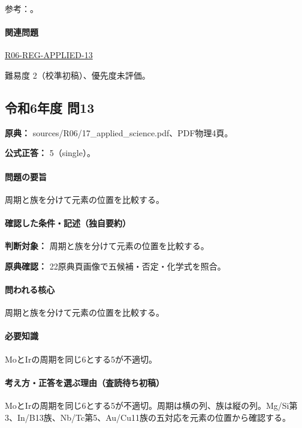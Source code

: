 \par 参考：\cite{atomic_nist2019}。

\paragraph{関連問題} \hyperref[q:r06-reg-applied-13]{R06-REG-APPLIED-13}

\par 難易度 2（校準初稿）、優先度未評価。

\subsection{令和6年度 問13}
\label{q:r06-reg-applied-13}

\noindent\textbf{原典：} sources/R06/17\_applied\_science.pdf、PDF物理4頁。

\textbf{公式正答：} 5（single）。

\paragraph{問題の要旨} 周期と族を分けて元素の位置を比較する。

\paragraph{確認した条件・記述（独自要約）}\mbox{}\par

\noindent\textbf{判断対象：} 周期と族を分けて元素の位置を比較する。\par

\noindent\textbf{原典確認：} 22原典頁画像で五候補・否定・化学式を照合。\par

\paragraph{問われる核心} 周期と族を分けて元素の位置を比較する。

\paragraph{必要知識} MoとIrの周期を同じ6とする5が不適切。

\paragraph{考え方・正答を選ぶ理由（査読待ち初稿）} MoとIrの周期を同じ6とする5が不適切。周期は横の列、族は縦の列。Mg/Si第3、In/B13族、Nb/Tc第5、Au/Cu11族の五対応を元素の位置から確認する。

